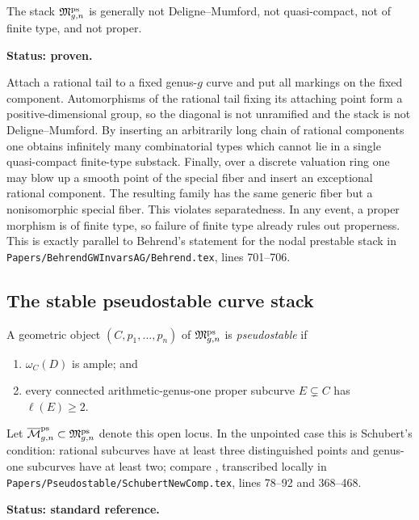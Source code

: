 \documentclass[12pt]{memoir}
\begin{document}
\begin{Prop}
    \label{prop-pre-ps-not-proper}
    The stack \(\mathfrak M^{\operatorname{\mathrm{ps}}}_{g,n}\) is generally not
    Deligne--Mumford, not quasi-compact, not of finite type, and not proper.

    \noindent\textbf{Status: proven.}
\end{Prop}

\begin{ptcbp}
    Attach a rational tail to a fixed genus-\(g\) curve and put all markings
    on the fixed component.  Automorphisms of the rational tail fixing its
    attaching point form a positive-dimensional group, so the diagonal is
    not unramified and the stack is not Deligne--Mumford.  By inserting an
    arbitrarily long chain of rational components one obtains infinitely many
    combinatorial types which cannot lie in a single quasi-compact finite-type
    substack.  Finally, over a discrete valuation ring one may blow up a
    smooth point of the special fiber and insert an exceptional rational
    component.  The resulting family has the same generic fiber but a
    nonisomorphic special fiber.  This violates separatedness.  In any event,
    a proper morphism is of finite type, so failure of finite type already
    rules out properness.  This is exactly parallel to Behrend's statement
    for the nodal prestable stack in
    \texttt{Papers/BehrendGWInvarsAG/Behrend.tex}, lines 701--706.
\end{ptcbp}

\subsection{The stable pseudostable curve stack}

\begin{Def}[Pseudostability]
    A geometric object \((C,p_1,\ldots,p_n)\) of
    \(\mathfrak M^{\operatorname{\mathrm{ps}}}_{g,n}\) is \emph{pseudostable} if
    \begin{enumerate}
        \item \(\omega_C(D)\) is ample; and
        \item every connected arithmetic-genus-one proper subcurve
        \(E\subsetneq C\)
        has \(\ell(E)\geq2\).
    \end{enumerate}
    Let \(\overline{\mathcal{M}}^{\operatorname{\mathrm{ps}}}_{g,n}\subset\mathfrak M^{\operatorname{\mathrm{ps}}}_{g,n}\) denote this
    open locus.  In the unpointed case this is Schubert's condition: rational
    subcurves have at least three distinguished points and genus-one
    subcurves have at least two; compare
    \cite[Definition in the Introduction and Section~4]{SchubertPSModSps},
    transcribed locally in
    \texttt{Papers/Pseudostable/SchubertNewComp.tex}, lines 78--92 and
    368--468.

    \noindent\textbf{Status: standard reference.}
\end{Def}
\end{document}
